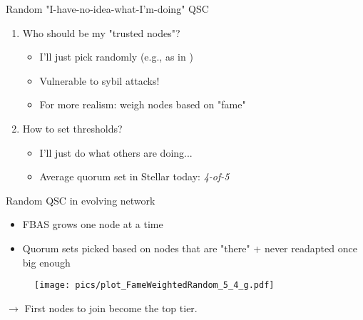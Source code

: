 \documentclass{beamer}
\newcommand{\redalert}[1]{\textcolor{hured}{#1}}
\newcommand{\arrow}[1][]{$\xrightarrow{\text{#1}}$ }
\begin{document}
\begin{frame}{Random "I-have-no-idea-what-I'm-doing" QSC}
  \vfill
  \begin{enumerate}
    \item \alert{Who should be my "trusted nodes"?} \begin{itemize}
      \item I'll just pick \alert{randomly} (e.g., as in \cite{chitra2019committee})
      \item \redalert{Vulnerable to sybil attacks!}
      \item For more realism: weigh nodes based on "fame"%
    \end{itemize}
    \vfill
    \item \alert{How to set thresholds?} \begin{itemize}
      \item I'll just do what others are doing...
      \item Average quorum set in Stellar today: \emph{4-of-5}
    \end{itemize}
  \end{enumerate}
  \vfill
\end{frame}

\begin{frame}{Random QSC in evolving network}
  \begin{itemize}
    \item FBAS grows one node at a time
    \item Quorum sets picked based on nodes that are "there" + never readapted once big enough
  \end{itemize}
  \begin{figure}[htpb]
    \centering
    \texttt{[image: pics/plot\_FameWeightedRandom\_5\_4\_g.pdf]}
  \end{figure}
  \centering
  \arrow \alert{First nodes to join} become the \alert{top tier}.
\end{frame}
\end{document}
